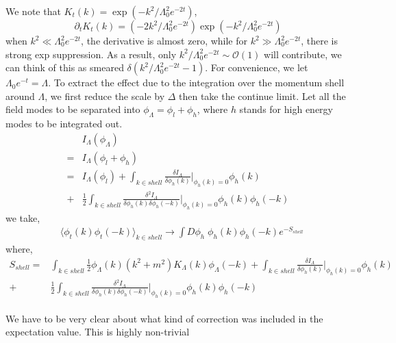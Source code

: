 \documentclass[a4paper,11pt]{article}
\begin{document}
We note that $K_t(k)=\exp(-k^2/\Lambda^2_0e^{-2t})$,
\begin{equation}
\partial_t K_t(k)=(-2k^2/\Lambda^2_0e^{-2t})   \exp(-k^2/\Lambda^2_0e^{-2t})  
\end{equation}
when $k^2\ll \Lambda^2_0e^{-2t}$, the derivative is almost zero, while for $k^2\gg \Lambda^2_0e^{-2t}$, there is strong exp suppression. As a result, only $k^2/\Lambda^2_0e^{-2t} \sim \mathcal{O}(1)$ will contribute, we can think of this as smeared $\delta(k^2/\Lambda^2_0e^{-2t} -1)$. For convenience, we let $\Lambda_0e^{-t}=\Lambda$. To extract the effect due to the integration over the momentum shell around $\Lambda$, we first reduce the scale by $\Delta$ then take the continue limit. Let all the field modes to be separated into $\phi_\Lambda=\phi_{l}+ \phi_{h}$, where $h$ stands for high energy modes to be integrated out.
\begin{equation}
\begin{split}
&I_{\Lambda}(\phi_\Lambda)\\
=&I_\Lambda(\phi_{l}+ \phi_{h})\\
=&I_\Lambda(\phi_{l})+\int_{k\in shell} \frac{\delta I_\Lambda}{\delta \phi_{h}(k)}\Big|_{\phi_{h}(k)=0} \phi_{h}(k)\\
+ & \frac{1}{2}\int_{k\in shell} \frac{\delta^2 I_\Lambda}{\delta \phi_{h}(k)\delta \phi_{h}(-k)}\Big|_{\phi_{h}(k)=0} \phi_{h}(k)\phi_{h}(-k)
\end{split}
\end{equation}
we take,
\begin{equation}
\begin{split}
 &\langle \phi_t(k) \phi_t(-k)  \rangle_{k\in shell} \rightarrow \int D\phi_{h}\; \phi_{h}(k) \phi_h(-k) e^{-S_{shell}}
\end{split}
\end{equation}
where,
\begin{equation}
\begin{split}
S_{shell}=& \int_{k\in shell} \frac{1}{2}\phi_\Lambda(k) (k^2 +m^2)K_\Lambda(k)\phi_\Lambda(-k) + \int_{k\in shell} \frac{\delta I_\Lambda}{\delta \phi_{h}(k)}\Big|_{\phi_{h}(k)=0} \phi_{h}(k)\\
+ &\frac{1}{2}\int_{k\in shell} \frac{\delta^2 I_\Lambda}{\delta \phi_{h}(k)\delta \phi_{h}(-k)}\Big|_{\phi_{h}(k)=0} \phi_{h}(k)\phi_{h}(-k)\\ \\ \\
\end{split}
\end{equation}
{\color{red} We have to be very clear about what kind of correction was included in the expectation value. This is highly non-trivial}
\end{document}
